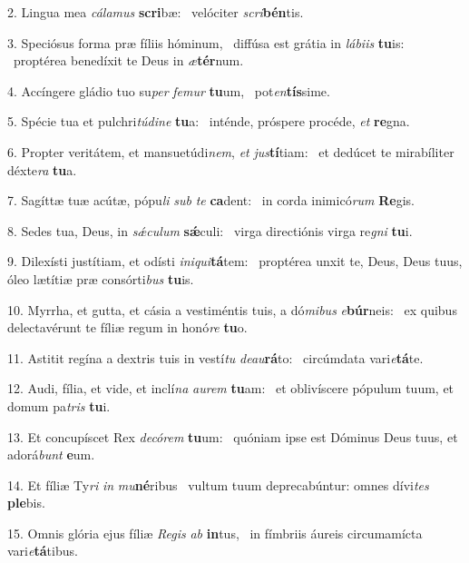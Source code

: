 2. Lingua mea \textit{cá}\textit{la}\textit{mus} \textbf{scri}bæ: \ast\  velóciter \textit{scri}\textbf{bén}tis.\

3. Speciósus forma præ fíliis hóminum, \dag\  diffúsa est grátia in \textit{lá}\textit{bi}\textit{is} \textbf{tu}is: \ast\  proptérea benedíxit te Deus in \textit{æ}\textbf{tér}num.\

4. Accíngere gládio tuo su\textit{per} \textit{fe}\textit{mur} \textbf{tu}um, \ast\  pot\textit{en}\textbf{tís}sime.\

5. Spécie tua et pulchri\textit{tú}\textit{di}\textit{ne} \textbf{tu}a: \ast\  inténde, próspere procéde, \textit{et} \textbf{re}gna.\

6. Propter veritátem, et mansuetúdi\textit{nem}, \textit{et} \textit{jus}\textbf{tí}tiam: \ast\  et dedúcet te mirabíliter déxte\textit{ra} \textbf{tu}a.\

7. Sagíttæ tuæ acútæ, pópu\textit{li} \textit{sub} \textit{te} \textbf{ca}dent: \ast\  in corda inimicó\textit{rum} \textbf{Re}gis.\

8. Sedes tua, Deus, in \textit{sǽ}\textit{cu}\textit{lum} \textbf{sǽ}culi: \ast\  virga directiónis virga re\textit{gni} \textbf{tu}i.\

9. Dilexísti justítiam, et odísti \textit{in}\textit{i}\textit{qui}\textbf{tá}tem: \ast\  proptérea unxit te, Deus, Deus tuus, óleo lætítiæ præ consórti\textit{bus} \textbf{tu}is.\

10. Myrrha, et gutta, et cásia a vestiméntis tuis, a dó\textit{mi}\textit{bus} \textit{e}\textbf{búr}neis: \ast\  ex quibus delectavérunt te fíliæ regum in honó\textit{re} \textbf{tu}o.\

11. Astitit regína a dextris tuis in vestí\textit{tu} \textit{de}\textit{au}\textbf{rá}to: \ast\  circúmdata vari\textit{e}\textbf{tá}te.\

12. Audi, fília, et vide, et inclí\textit{na} \textit{au}\textit{rem} \textbf{tu}am: \ast\  et oblivíscere pópulum tuum, et domum pa\textit{tris} \textbf{tu}i.\

13. Et concupíscet Rex \textit{de}\textit{có}\textit{rem} \textbf{tu}um: \ast\  quóniam ipse est Dóminus Deus tuus, et adorá\textit{bunt} \textbf{e}um.\

14. Et fíliæ Ty\textit{ri} \textit{in} \textit{mu}\textbf{né}ribus \ast\  vultum tuum deprecabúntur: omnes dívi\textit{tes} \textbf{ple}bis.\

15. Omnis glória ejus fíliæ \textit{Re}\textit{gis} \textit{ab} \textbf{in}tus, \ast\  in fímbriis áureis circumamícta vari\textit{e}\textbf{tá}tibus.\

